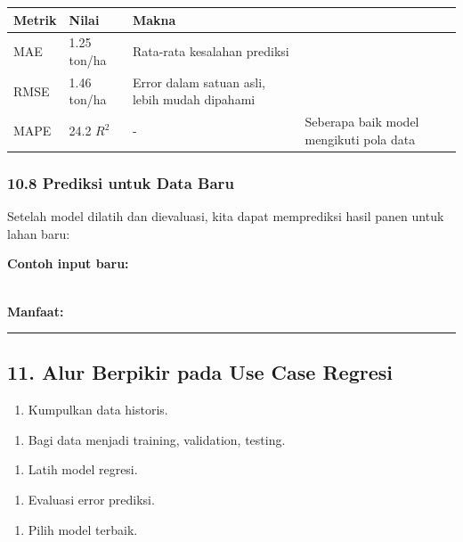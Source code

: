 \documentclass[12pt,a4paper]{article}
\begin{document}
\begin{tabular}{|l|l|l|}
\hline
Metrik & Nilai & Makna \\
\hline
MAE & 1.25 ton/ha & Rata-rata kesalahan prediksi \\
\hline
RMSE & 1.46 ton/ha & Error dalam satuan asli, lebih mudah dipahami \\
\hline
MAPE & 24.2%
\hline
$R^2$ & - & Seberapa baik model mengikuti pola data \\
\hline
\end{tabular}


\subsubsection{10.8 Prediksi untuk Data Baru}

Setelah model dilatih dan dievaluasi, kita dapat memprediksi hasil panen untuk lahan baru:


\textbf{Contoh input baru:}


\\[
\hat{y} = f(X_{\text{baru}})
\\]


\textbf{Manfaat:}


\hrule


\subsection{11. Alur Berpikir pada Use Case Regresi}

\begin{enumerate}
\item Kumpulkan data historis.
\end{enumerate}

\begin{enumerate}
\item Bagi data menjadi training, validation, testing.
\end{enumerate}

\begin{enumerate}
\item Latih model regresi.
\end{enumerate}

\begin{enumerate}
\item Evaluasi error prediksi.
\end{enumerate}

\begin{enumerate}
\item Pilih model terbaik.
\end{enumerate}
\end{document}
